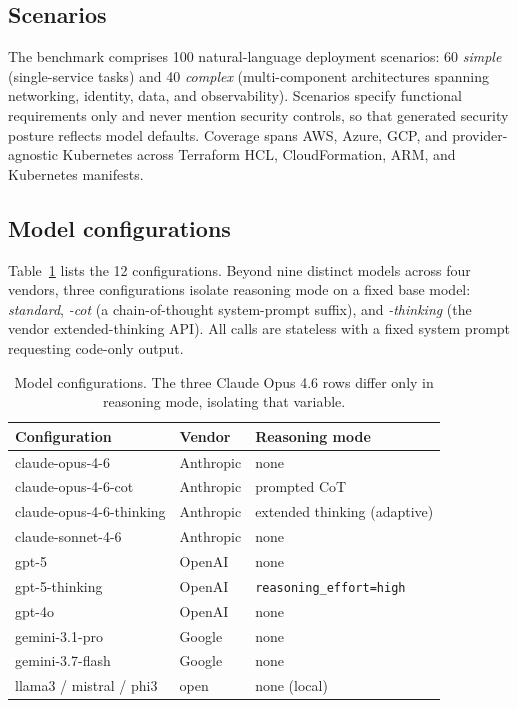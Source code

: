 \documentclass[conference]{IEEEtran}
\begin{document}
\subsection{Scenarios}
The benchmark comprises 100 natural-language deployment scenarios: 60
\emph{simple} (single-service tasks) and 40 \emph{complex} (multi-component
architectures spanning networking, identity, data, and observability). Scenarios
specify functional requirements only and never mention security controls, so
that generated security posture reflects model defaults. Coverage spans AWS,
Azure, GCP, and provider-agnostic Kubernetes across Terraform HCL,
CloudFormation, ARM, and Kubernetes manifests.

\subsection{Model configurations}
Table~\ref{tab:models} lists the 12 configurations. Beyond nine distinct models
across four vendors, three configurations isolate reasoning mode on a fixed base
model: \emph{standard}, \emph{-cot} (a chain-of-thought system-prompt suffix),
and \emph{-thinking} (the vendor extended-thinking API). All calls are stateless
with a fixed system prompt requesting code-only output.

\begin{table}[t]
\caption{Model configurations. The three Claude Opus 4.6 rows differ only in
reasoning mode, isolating that variable.}
\label{tab:models}
\centering
\small
\begin{tabular}{@{}lll@{}}
\toprule
Configuration & Vendor & Reasoning mode \\
\midrule
claude-opus-4-6           & Anthropic & none \\
claude-opus-4-6-cot       & Anthropic & prompted CoT \\
claude-opus-4-6-thinking  & Anthropic & extended thinking (adaptive) \\
claude-sonnet-4-6         & Anthropic & none \\
gpt-5                     & OpenAI    & none \\
gpt-5-thinking            & OpenAI    & \texttt{reasoning\_effort=high} \\
gpt-4o                    & OpenAI    & none \\
gemini-3.1-pro            & Google    & none \\
gemini-3.7-flash          & Google    & none \\
llama3 / mistral / phi3   & open       & none (local) \\
\bottomrule
\end{tabular}
\end{table}
\end{document}
